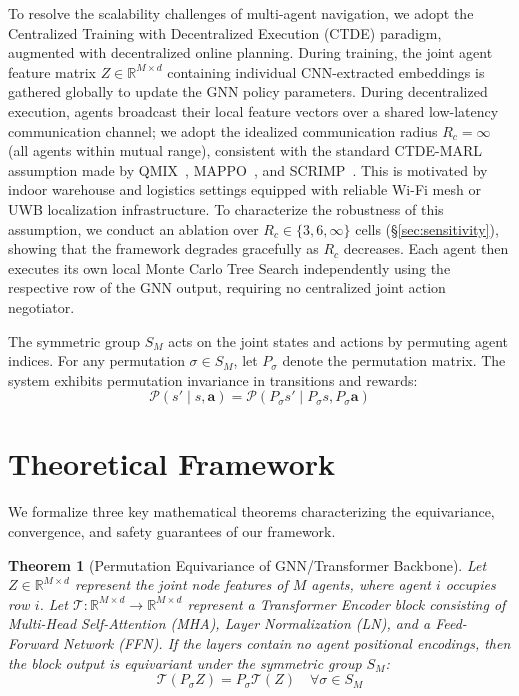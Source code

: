 \documentclass[11pt,a4paper]{article}
\newtheorem{theorem}{Theorem}
\begin{document}
To resolve the scalability challenges of multi-agent navigation, we adopt the Centralized Training with Decentralized Execution (CTDE) paradigm, augmented with decentralized online planning. During training, the joint agent feature matrix $Z \in \mathbb{R}^{M \times d}$ containing individual CNN-extracted embeddings is gathered globally to update the GNN policy parameters. During decentralized execution, agents broadcast their local feature vectors over a shared low-latency communication channel; we adopt the idealized communication radius $R_c = \infty$ (all agents within mutual range), consistent with the standard CTDE-MARL assumption made by QMIX~\cite{rashid2018qmix}, MAPPO~\cite{yu2021surprising}, and SCRIMP~\cite{wang2023scrimp}. This is motivated by indoor warehouse and logistics settings equipped with reliable Wi-Fi mesh or UWB localization infrastructure. To characterize the robustness of this assumption, we conduct an ablation over $R_c \in \{3, 6, \infty\}$ cells (\S\ref{sec:sensitivity}), showing that the framework degrades gracefully as $R_c$ decreases. Each agent then executes its own local Monte Carlo Tree Search independently using the respective row of the GNN output, requiring no centralized joint action negotiator.

The symmetric group $S_M$ acts on the joint states and actions by permuting agent indices. For any permutation $\sigma \in S_M$, let $P_\sigma$ denote the permutation matrix. The system exhibits permutation invariance in transitions and rewards:
\begin{equation}
    \mathcal{P}(s' \mid s, \mathbf{a}) = \mathcal{P}(P_\sigma s' \mid P_\sigma s, P_\sigma \mathbf{a})
\end{equation}

\section{Theoretical Framework}
We formalize three key mathematical theorems characterizing the equivariance, convergence, and safety guarantees of our framework.

\begin{theorem}[Permutation Equivariance of GNN/Transformer Backbone]\label{thm:perm_equiv}
Let $Z \in \mathbb{R}^{M \times d}$ represent the joint node features of $M$ agents, where agent $i$ occupies row $i$. Let $\mathcal{T}: \mathbb{R}^{M \times d} \to \mathbb{R}^{M \times d}$ represent a Transformer Encoder block consisting of Multi-Head Self-Attention (MHA), Layer Normalization (LN), and a Feed-Forward Network (FFN). If the layers contain no agent positional encodings, then the block output is equivariant under the symmetric group $S_M$:
\begin{equation}
    \mathcal{T}(P_\sigma Z) = P_\sigma \mathcal{T}(Z) \quad \forall \sigma \in S_M
\end{equation}
\end{theorem}
\end{document}
